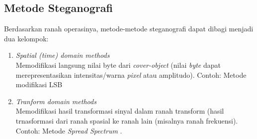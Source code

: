 	\subsection{Metode Steganografi}
	Berdasarkan ranah operasinya, metode-metode steganografi dapat dibagi menjadi dua kelompok:
	\begin{enumerate}
		\item \emph{Spatial (time) domain methods}\\
		Memodifikasi langsung nilai byte dari \emph{cover-object} (nilai \emph{byte} dapat merepresentasikan intensitas/warna \emph{pixel} atau amplitudo). Contoh: Metode modifikasi LSB
		
		\item \emph{Tranform domain methods}\\
		Memodifikasi hasil transformasi sinyal dalam ranah transform (hasil trnasformasi dari ranah spasial ke ranah lain (misalnya ranah frekuensi). Contoh: Metode \emph{Spread Spectrum} \cite{munir}.
		
	\end{enumerate}

